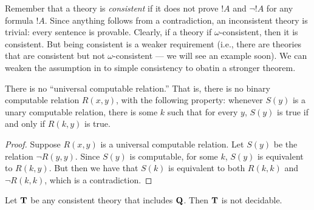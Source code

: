 \documentclass[../../include/open-logic-section]{subfiles}
\begin{document}


\begin{explain}
Remember that a theory is {\em consistent} if it does not prove $!A$
and $\lnot !A$ for any formula $!A$. Since anything follows from a
contradiction, an inconsistent theory is trivial: every sentence is
provable. Clearly, if a theory if $\omega$-consistent, then it is
consistent. But being consistent is a weaker requirement (i.e., there
are theories that are consistent but not $\omega$-consistent --- we
will see an example soon). We can weaken the assumption in
 to simple consistency to obatin a stronger
theorem.
\end{explain}

\begin{lem}
There is no ``universal computable relation.'' That is, there is no
binary computable relation $R(x,y)$, with the following property:
whenever $S(y)$ is a unary computable relation, there is some $k$ such
that for every $y$, $S(y)$ is true if and only if $R(k,y)$ is true.
\end{lem}

\begin{proof}
Suppose $R(x,y)$ is a universal computable relation. Let $S(y)$
be the relation $\lnot R(y,y)$. Since $S(y)$ is computable, for some
$k$, $S(y)$ is equivalent to $R(k,y)$. But then we have that $S(k)$ is
equivalent to both $R(k,k)$ and $\lnot R(k,k)$, which is a
contradiction.
\end{proof}


\begin{thm}
Let $\mathbf{T}$ be any consistent theory that includes $\mathbf{Q}$. Then
$\mathbf{T}$ is not decidable.
\end{thm}
\end{document}
